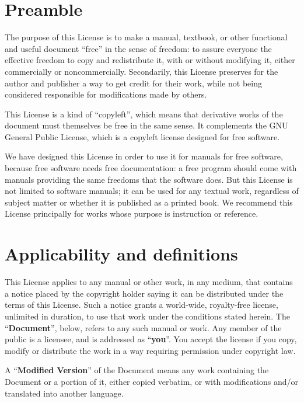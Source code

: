 \def\thesection{\arabic{section}.}
\setcounter{section}{-1}

\section{Preamble}

The purpose of this License is to make a manual, textbook, or other
functional and useful document ``free'' in the sense of freedom: to
assure everyone the effective freedom to copy and redistribute it,
with or without modifying it, either commercially or noncommercially.
Secondarily, this License preserves for the author and publisher a way
to get credit for their work, while not being considered responsible
for modifications made by others.

This License is a kind of ``copyleft'', which means that derivative
works of the document must themselves be free in the same sense.  It
complements the GNU General Public License, which is a copyleft
license designed for free software.

We have designed this License in order to use it for manuals for free
software, because free software needs free documentation: a free
program should come with manuals providing the same freedoms that the
software does.  But this License is not limited to software manuals;
it can be used for any textual work, regardless of subject matter or
whether it is published as a printed book.  We recommend this License
principally for works whose purpose is instruction or reference.


\section{Applicability and definitions}

This License applies to any manual or other work, in any medium, that
contains a notice placed by the copyright holder saying it can be
distributed under the terms of this License.  Such a notice grants a
world-wide, royalty-free license, unlimited in duration, to use that
work under the conditions stated herein.  The ``\textbf{Document}'', below,
refers to any such manual or work.  Any member of the public is a
licensee, and is addressed as ``\textbf{you}''.  You accept the license if you
copy, modify or distribute the work in a way requiring permission
under copyright law.

A ``\textbf{Modified Version}'' of the Document means any work containing the
Document or a portion of it, either copied verbatim, or with
modifications and/or translated into another language.

